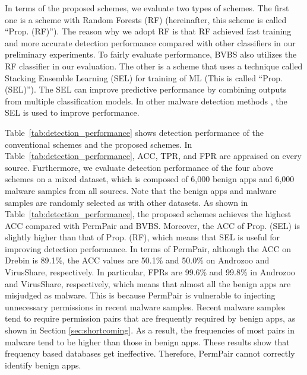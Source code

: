 \documentclass{ieeeaccess}
\newcommand{\mytablename}{Table}
\begin{document}
In terms of the proposed schemes, we evaluate two types of schemes.
The first one is a scheme with Random Forests (RF) \cite{breiman2001random} (hereinafter, this scheme is called ``Prop. (RF)'').
The reason why we adopt RF is that RF achieved fast training and more accurate detection performance compared with other classifiers in our preliminary experiments.
To fairly evaluate performance, BVBS also utilizes the RF classifier in our evaluation.
The other is a scheme that uses a technique called Stacking Ensemble Learning (SEL) for training of ML (This is called ``Prop. (SEL)'').
The SEL can improve predictive performance by combining outputs from multiple classification models.
In other malware detection methods \cite{vasan2020mthael, zhu2020sedmdroid}, the SEL is used to improve performance.

\mytablename~\ref{tab:detection_performance} shows detection performance of the conventional schemes and the proposed schemes.
In \mytablename~\ref{tab:detection_performance}, ACC, TPR, and FPR are appraised on every source. 
Furthermore, we evaluate detection performance of the four above schemes on a mixed dataset, which is composed of 6,000 benign apps and 6,000 malware samples from all sources.
Note that the benign apps and malware samples are randomly selected as with other datasets.
As shown in \mytablename~\ref{tab:detection_performance}, the proposed schemes achieves the highest ACC compared with PermPair and BVBS.
Moreover, the ACC of Prop. (SEL) is slightly higher than that of Prop. (RF), which means that SEL is useful for improving detection performance.
In terms of PermPair, although the ACC on Drebin is 89.1\%, the ACC values are 50.1\% and 50.0\% on Androzoo and VirusShare, respectively.
In particular, FPRs are 99.6\% and 99.8\% in Androzoo and VirusShare, respectively, which means that almost all the benign apps are misjudged as malware.
This is because PermPair is vulnerable to injecting unnecessary permissions in recent malware samples.
Recent malware samples tend to require permission pairs that are frequently required by benign apps, as shown in Section \ref{sec:shortcoming}.
As a result, the frequencies of most pairs in malware tend to be higher than those in benign apps.
These results show that frequency based databases get ineffective.
Therefore, PermPair cannot correctly identify benign apps.
\end{document}
